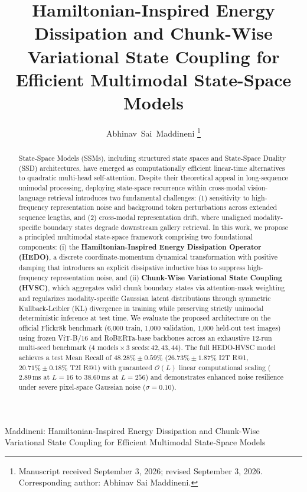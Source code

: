 \documentclass[11pt,journal,onecolumn,draftcls]{IEEEtran}
\begin{document}
\title{Hamiltonian-Inspired Energy Dissipation and Chunk-Wise Variational State Coupling for Efficient Multimodal State-Space Models}

\author{Abhinav~Sai~Maddineni%
\thanks{Manuscript received September 3, 2026; revised September 3, 2026. Corresponding author: Abhinav Sai Maddineni.}%
}

%
{Maddineni: Hamiltonian-Inspired Energy Dissipation and Chunk-Wise Variational State Coupling for Efficient Multimodal State-Space Models}

\maketitle

\begin{abstract}
State-Space Models (SSMs), including structured state spaces and State-Space Duality (SSD) architectures, have emerged as computationally efficient linear-time alternatives to quadratic multi-head self-attention. Despite their theoretical appeal in long-sequence unimodal processing, deploying state-space recurrence within cross-modal vision-language retrieval introduces two fundamental challenges: (1) sensitivity to high-frequency representation noise and background token perturbations across extended sequence lengths, and (2) cross-modal representation drift, where unaligned modality-specific boundary states degrade downstream gallery retrieval. In this work, we propose a principled multimodal state-space framework comprising two foundational components: (i) the \textbf{Hamiltonian-Inspired Energy Dissipation Operator (HEDO)}, a discrete coordinate-momentum dynamical transformation with positive damping that introduces an explicit dissipative inductive bias to suppress high-frequency representation noise, and (ii) \textbf{Chunk-Wise Variational State Coupling (HVSC)}, which aggregates valid chunk boundary states via attention-mask weighting and regularizes modality-specific Gaussian latent distributions through symmetric Kullback-Leibler (KL) divergence in training while preserving strictly unimodal deterministic inference at test time. We evaluate the proposed architecture on the official Flickr8k benchmark (6,000 train, 1,000 validation, 1,000 held-out test images) using frozen ViT-B/16 and RoBERTa-base backbones across an exhaustive 12-run multi-seed benchmark ($4\text{ models} \times 3\text{ seeds}: 42, 43, 44$). The full HEDO-HVSC model achieves a test Mean Recall of $48.28\% \pm 0.59\%$ ($26.73\% \pm 1.87\%$ I2T R@1, $20.71\% \pm 0.18\%$ T2I R@1) with guaranteed $\mathcal{O}(L)$ linear computational scaling ($2.89\,\text{ms}$ at $L=16$ to $38.60\,\text{ms}$ at $L=256$) and demonstrates enhanced noise resilience under severe pixel-space Gaussian noise ($\sigma=0.10$).
\end{abstract}
\end{document}
